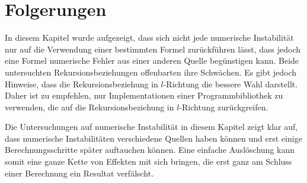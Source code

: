%
%
%
\section{Folgerungen
\label{legendre:section:folgerungen}}
In diesem Kapitel wurde aufgezeigt, dass sich nicht jede numerische Instabilität nur auf die Verwendung einer bestimmten Formel zurückführen lässt, dass jedoch eine Formel numerische Fehler aus einer anderen Quelle begünstigen kann.
Beide untersuchten Rekursionsbeziehungen offenbarten ihre Schwächen.
Es gibt jedoch Hinweise, dass die Rekursionsbeziehung in $l$-Richtung die bessere Wahl darstellt.
Daher ist zu empfehlen, nur Implementationen einer Programmbibliothek zu verwenden, die auf die Rekursionsbeziehung in $l$-Richtung zurückgreifen.

Die Untersuchungen auf numerische Instabilität in diesem Kapitel zeigt klar auf, dass numerische Instabilitäten verschiedene Quellen haben können und erst einige Berechnungsschritte später auftauchen können.
Eine einfache Auslöschung kann somit eine ganze Kette von Effekten mit sich bringen, die erst ganz am Schluss einer Berechnung ein Resultat verfälscht.
